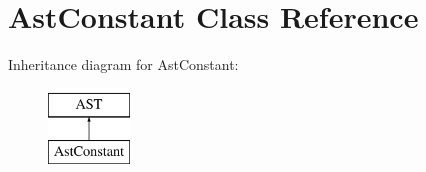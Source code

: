 \hypertarget{classAstConstant}{\section{Ast\-Constant Class Reference}
\label{classAstConstant}
}
Inheritance diagram for Ast\-Constant\-:\begin{figure}[H]
\begin{center}
\leavevmode
\includegraphics[height=2.000000cm]{classAstConstant}
\end{center}
\end{figure}
